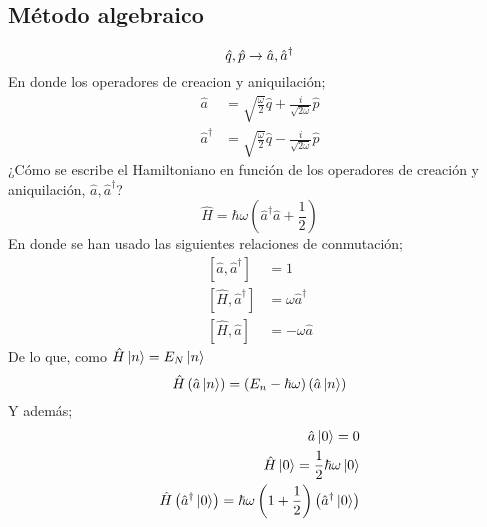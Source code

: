 \documentclass[../main.tex]{subfiles}
\begin{document}
   \subsection{Método algebraico}
   \begin{equation}
     \hat{q},\hat{p} \rightarrow \hat{a},\hat{a}^\dagger \\
    \end{equation}
    En donde los operadores de creacion y aniquilación;
   \begin{align}
     \hat{a} & = \sqrt{\frac{\omega}{2}} \hat{q} + \frac{i}{\sqrt{2\omega}}\hat{p}\\
     \hat{a}^\dagger & = \sqrt{\frac{\omega}{2}}\hat{q} - \frac{i}{\sqrt{2\omega}}\hat{p}
   \end{align}
   ¿Cómo se escribe el Hamiltoniano en función de los operadores de creación y aniquilación, $\hat{a}, \hat{a}^\dagger$?
   \begin{equation}
     \hat{H} = \hbar\omega \left( \hat{a}^\dagger \hat{a} + \frac{1}{2} \right) 
    \end{equation}
    En donde se han usado las siguientes relaciones de conmutación;
    \begin{align}
      \left[ \hat{a}, \hat{a}^\dagger  \right] & = 1 \\
      \left[ \hat{H} , \hat{a}^\dagger  \right] & = \omega \hat{a}^\dagger \\
      \left[ \hat{H} , \hat{a} \right] & = -\omega \hat{a}
    \end{align}
    De lo que, como $\hat{H}\ket{n} = E_N\ket{n}$
      \begin{equation}
        \hat{H} \left( \hat{a}\ket{n} \right) = \left( E_n - \hbar\omega \right) \left( \hat{a}\ket{n} \right)
       \end{equation}
    Y además;
    \begin{align*}
      \hat{a} \ket{0} = 0 \\
      \hat{H}\ket{0} = \frac{1}{2}\hbar\omega \ket{0} \\
      \hat{H} \left( \hat{a}^\dagger \ket{0} \right) = \hbar\omega \left( 1 + \frac{1}{2} \right) \left( \hat{a}^\dagger \ket{0} \right)
    \end{align*}
\end{document}
